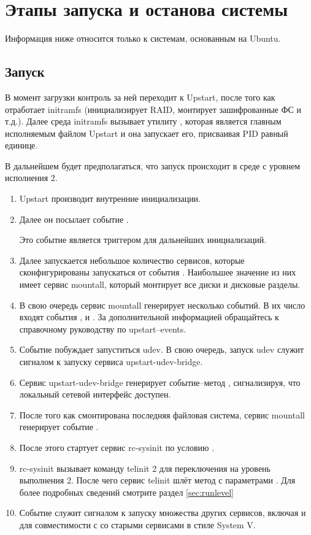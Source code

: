 \chapter{Этапы запуска и останова системы}
Информация ниже относится только к системам, основанным на Ubuntu.
\section{Запуск}
В момент загрузки контроль за ней переходит к Upstart, после того как отработает initramfs (инициализирует 
RAID, монтирует зашифрованные ФС и т.д.). Далее среда initramfs вызывает утилиту , которая является главным исполняемым файлом Upstart и она запускает его, присваивая PID равный единице.

В дальнейшем будет предполагаться, что запуск происходит в среде с уровнем исполнения 2. \begin{enumerate}
\item Upstart производит внутренние инициализации.
\item Далее он посылает событие .

Это событие является триггером для дальнейших инициализаций.
\item Далее запускается небольшое количество сервисов, которые сконфигурированы запускаться от события . Наибольшее значение из них имеет сервис mountall, который монтирует все диски и дисковые разделы.
\item В свою очередь сервис mountall генерирует несколько событий. В их число входят события ,  и . За дополнительной информацией обращайтесь к справочному руководству по upstart--events.
\item Событие  побуждает запуститься udev. В свою очередь, запуск udev служит сигналом к запуску сервиса upstart-udev-bridge.
\item Сервис upstart-udev-bridge генерирует событие--метод , сигнализируя, 
что локальный сетевой интерфейс доступен.
\item После того как смонтирована последняя файловая система, сервис mountall генерирует событие .
\item После этого стартует сервис rc-sysinit по условию .
\item rc-sysinit вызывает команду telinit 2 для переключения на уровень выполнения 2. После чего сервис telinit шлёт метод с параметрами . Для более подробных сведений смотрите раздел \ref{sec:runlevel}
\item Событие  служит сигналом к запуску множества других сервисов, включая и  для совместимости с со старыми сервисами в стиле System V.
\end{enumerate}

